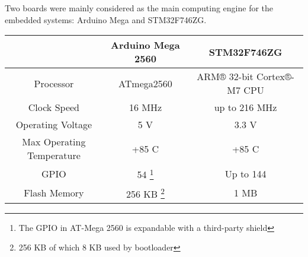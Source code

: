 \documentclass[11pt,a4paper,oldfontcommands]{memoir}
\begin{document}
																																																																														    Two boards were mainly considered as the main computing engine for the embedded systems: Arduino Mega  and STM32F746ZG.

																																																																														    \bigskip
																																																																														    \begin{minipage}{\textwidth}
																																																																														    \begin{center}
																																																																														    \begin{tabular}{ |c||c|c| }
																																																																														     \hline
																																																																														      & Arduino Mega 2560 & STM32F746ZG\\
																																																																														       \hline\hline
																																																																														        Processor & ATmega2560 & ARM® 32-bit Cortex®-M7 CPU \\
																																																																															 \hline
																																																																															  Clock Speed & 16 MHz & up to 216 MHz \\
																																																																															   \hline
																																																																															    Operating Voltage & 5 V & 3.3 V \\
																																																																															     \hline
																																																																															      Max Operating Temperature & +85 \degree C & +85 \degree C \\
																																																																															       \hline
																																																																															        GPIO & 54 \footnote{The GPIO in AT-Mega 2560 is expandable with a third-party shield} & Up to 144 \\
																																																																																 \hline
																																																																																  Flash Memory & 256 KB \footnote{256 KB of which 8 KB used by bootloader} & 1 MB \\
																																																																																   \hline
																																																																																   \end{tabular}
																																																																																   \end{center}
																																																																																   \end{minipage}
																																																																																   \bigskip
\end{document}
